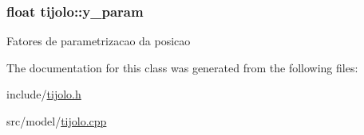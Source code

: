 \subsubsection[{\texorpdfstring{y\+\_\+param}{y_param}}]{\setlength{\rightskip}{0pt plus 5cm}float tijolo\+::y\+\_\+param\hspace{0.3cm}{\ttfamily [private]}}\hypertarget{classtijolo_ab4b4106e1ff29da211d56df195bb919a}{}\label{classtijolo_ab4b4106e1ff29da211d56df195bb919a}
Fatores de parametrizacao da posicao 

The documentation for this class was generated from the following files\+:\begin{DoxyCompactItemize}
\item 
include/\hyperlink{tijolo_8h}{tijolo.\+h}\item 
src/model/\hyperlink{tijolo_8cpp}{tijolo.\+cpp}\end{DoxyCompactItemize}
